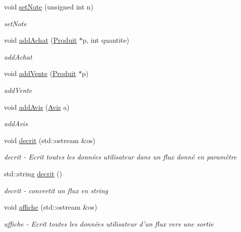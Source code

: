 \begin{DoxyCompactItemize}
void \hyperlink{class_utilisateur_a703b2dbde2ba4e30fceefa651d4ab51f}{set\-Note} (unsigned int n)
\begin{DoxyCompactList}\small\item\em set\-Note \end{DoxyCompactList}\item 
void \hyperlink{class_utilisateur_aa38d52a678907e9159417a162970b7da}{add\-Achat} (\hyperlink{class_produit}{Produit} $\ast$p, int quantite)
\begin{DoxyCompactList}\small\item\em add\-Achat \end{DoxyCompactList}\item 
void \hyperlink{class_utilisateur_ac388127f7ea147a70a67ff6345ccb164}{add\-Vente} (\hyperlink{class_produit}{Produit} $\ast$p)
\begin{DoxyCompactList}\small\item\em add\-Vente \end{DoxyCompactList}\item 
void \hyperlink{class_utilisateur_aa8b2cad2349702cf2fa8f23fef2e5a9d}{add\-Avis} (\hyperlink{class_avis}{Avis} a)
\begin{DoxyCompactList}\small\item\em add\-Avis \end{DoxyCompactList}\item 
void \hyperlink{class_utilisateur_ad4c1dbab122bf719cf1419b9d93a0e22}{decrit} (std\-::ostream \&os)
\begin{DoxyCompactList}\small\item\em decrit -\/ Ecrit toutes les données utilisateur dans un flux donné en paramètre \end{DoxyCompactList}\item 
std\-::string \hyperlink{class_utilisateur_a938eda997ac76805b7674c7ffe7e17e8}{decrit} ()
\begin{DoxyCompactList}\small\item\em decrit -\/ convertit un flux en string \end{DoxyCompactList}\item 
void \hyperlink{class_utilisateur_a810f877d63ef4b8b2f6b18dfc1cd26f9}{affiche} (std\-::ostream \&os)
\begin{DoxyCompactList}\small\item\em affiche -\/ Ecrit toutes les données utilisateur d'un flux vers une sortie \end{DoxyCompactList}\end{DoxyCompactItemize}
